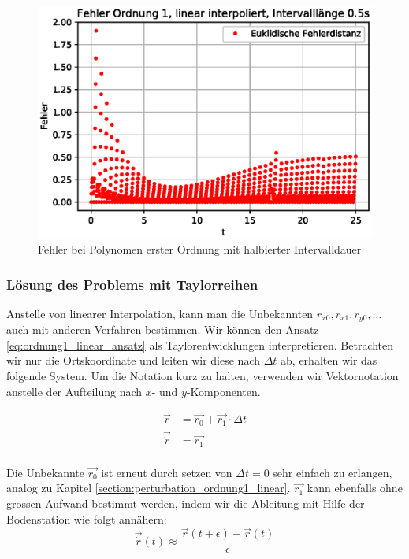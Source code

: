 \begin{figure}
	\centering
	\includegraphics[scale=0.7]{papers/perturbation/bilder/perturbation_fig8.eps}
	\caption{Fehler bei Polynomen erster Ordnung mit halbierter Intervalldauer}
	\label{fig:ordnung1_linear_error_C}
\end{figure}

\subsubsection{Lösung des Problems mit Taylorreihen}
Anstelle von linearer Interpolation, kann man die Unbekannten $r_{x0}, r_{x1}, r_{y0}, \dots$ auch mit anderen Verfahren bestimmen. 
Wir können den Ansatz \eqref{eq:ordnung1_linear_ansatz} als Taylorentwicklungen interpretieren. 
Betrachten wir nur die Ortskoordinate und leiten wir diese nach $\Delta t$ ab, erhalten wir das folgende System. Um die Notation kurz zu halten, verwenden wir Vektornotation anstelle der Aufteilung nach $x$- und $y$-Komponenten.

\begin{equation}
\label{eq:ordnung1_taylor_ansatz}
\begin{aligned}
\vec{r} &=  \vec{r_0} + \vec{r_1} \cdot \Delta t \\
\vec{\dot{r}} &= \vec{r_1} \\
\end{aligned}
\end{equation}

Die Unbekannte $\vec{r_0}$ ist erneut durch setzen von $\Delta t = 0$ sehr einfach zu erlangen, analog zu Kapitel \ref{section:perturbation_ordnung1_linear}. $\vec{r_1}$ kann ebenfalls ohne grossen Aufwand bestimmt werden, indem wir die Ableitung mit Hilfe der Bodenstation wie folgt annähern:
\[
\vec{\dot{r}}(t) \approx \frac{\vec{r}(t+\epsilon) - \vec{r}(t)}{\epsilon}
\]

